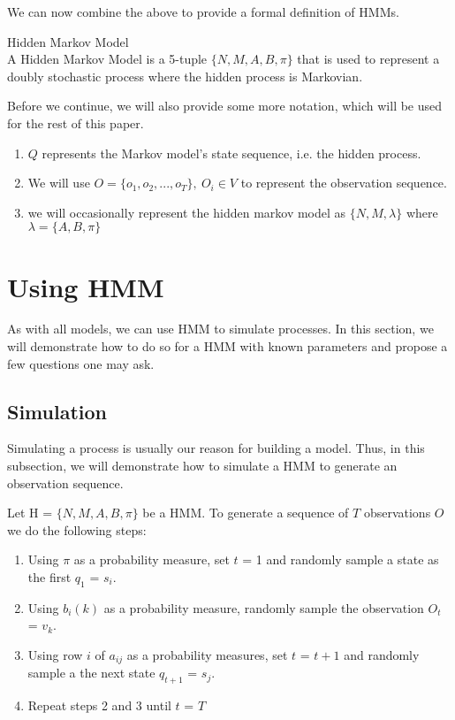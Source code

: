 We can now combine the above to provide a formal definition of HMMs.

\begin{definition}
    \label{Definition:HMM} Hidden Markov Model \\
    A Hidden Markov Model is a 5-tuple $\{N,M,A,B,\pi \}$ that is used to represent a doubly stochastic process where the hidden process is Markovian. 
\end{definition}

Before we continue, we will also provide some more notation, which will be used for the rest of this paper.
\begin{enumerate}[i]
    \item $Q$ represents the Markov model's state sequence, i.e. the hidden process.
    \item We will use $O = \{o_1,o_2,...,o_T\} ,\ O_i \in V$ to represent the observation sequence.
    \item we will occasionally represent the hidden markov model as $\{N,M, \lambda \}$ where $\lambda = \{A, B, \pi\}$ 
\end{enumerate}


\section{Using HMM}
\label{Hidden_Markov:Using_HMM}

As with all models, we can use HMM to simulate processes. In this section, we will demonstrate how to do so for a HMM with known parameters and propose a few questions one may ask.

    \subsection{Simulation}
    \label{Hidden_Markov:Using_HMM:Simulation}

    Simulating a process is usually our reason for building a model.   Thus, in this subsection, we will demonstrate how to simulate a HMM to generate an observation sequence.

    Let H = $\{N,M,A,B,\pi\}$ be a HMM. To generate a sequence of $T$ observations $O$ we do the following steps:
     \begin{enumerate}
        \label{Hidden_Markov:Using_HMM:Simulation:Method}
         \item Using $\pi$ as a probability measure, set $t$ = 1 and    randomly sample a state as the first $q_1$ = $s_i$.
         \item Using $b_i(k)$ as a probability measure, randomly sample the observation $O_t$ = $v_k$.
         \item Using row $i$ of $a_{ij}$ as a probability measures, set $t$ = $t+1$    and randomly sample a the next state $q_{t+1}$ = $s_j$.
         \item Repeat steps 2 and 3 until $t$ = $T$
     \end{enumerate}


